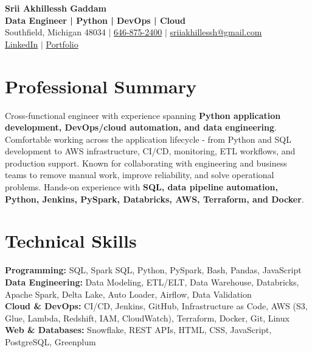\documentclass[letterpaper,10pt]{article}
\begin{document}
\fontsize{9.35pt}{10.45pt}\selectfont

\begin{center}
    {\LARGE \textbf{Srii Akhillessh Gaddam}} \\[-1pt]
    \textbf{Data Engineer | Python | DevOps | Cloud} \\[2pt]
    Southfield, Michigan 48034 $|$
    \href{tel:6468752400}{646-875-2400} $|$
    \href{mailto:sriiakhillessh@gmail.com}{sriiakhillessh@gmail.com} \\[1pt]
    \href{https://www.linkedin.com/in/srii-akhiilessh-gaddam-b48668191/}{LinkedIn} $|$
    \href{https://sriiakhillesshg.github.io/portfolio/}{Portfolio}
\end{center}
\vspace{-8pt}

\section{Professional Summary}
\small{Cross-functional engineer with experience spanning \textbf{Python application development, DevOps/cloud automation, and data engineering}. Comfortable working across the application lifecycle - from Python and SQL development to AWS infrastructure, CI/CD, monitoring, ETL workflows, and production support. Known for collaborating with engineering and business teams to remove manual work, improve reliability, and solve operational problems. Hands-on experience with \textbf{SQL, data pipeline automation, Python, Jenkins, PySpark, Databricks, AWS, Terraform, and Docker}.}

\section{Technical Skills}
\small{
\textbf{Programming:} SQL, Spark SQL, Python, PySpark, Bash, Pandas, JavaScript \\
\textbf{Data Engineering:} Data Modeling, ETL/ELT, Data Warehouse, Databricks, Apache Spark, Delta Lake, Auto Loader, Airflow, Data Validation \\
\textbf{Cloud \& DevOps:} CI/CD, Jenkins, GitHub, Infrastructure as Code, AWS (S3, Glue, Lambda, Redshift, IAM, CloudWatch), Terraform, Docker, Git, Linux \\
\textbf{Web \& Databases:} Snowflake, REST APIs, HTML, CSS, JavaScript, PostgreSQL, Greenplum
}
\end{document}
